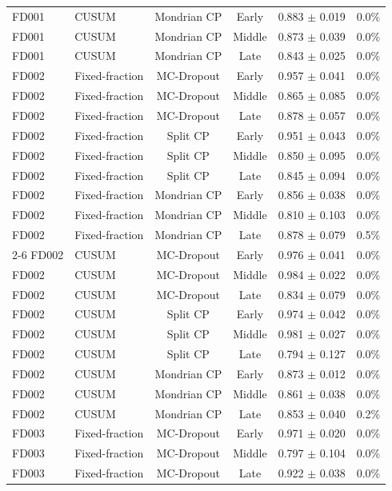 \begin{table}[t]
\begin{tabular}{llcccc}
FD001 & CUSUM & Mondrian CP & Early & 0.883 $\pm$ 0.019 & 0.0\% \\
FD001 & CUSUM & Mondrian CP & Middle & 0.873 $\pm$ 0.039 & 0.0\% \\
FD001 & CUSUM & Mondrian CP & Late & 0.843 $\pm$ 0.025 & 0.0\% \\
\midrule
FD002 & Fixed-fraction & MC-Dropout & Early & 0.957 $\pm$ 0.041 & 0.0\% \\
FD002 & Fixed-fraction & MC-Dropout & Middle & 0.865 $\pm$ 0.085 & 0.0\% \\
FD002 & Fixed-fraction & MC-Dropout & Late & 0.878 $\pm$ 0.057 & 0.0\% \\
FD002 & Fixed-fraction & Split CP & Early & 0.951 $\pm$ 0.043 & 0.0\% \\
FD002 & Fixed-fraction & Split CP & Middle & 0.850 $\pm$ 0.095 & 0.0\% \\
FD002 & Fixed-fraction & Split CP & Late & 0.845 $\pm$ 0.094 & 0.0\% \\
FD002 & Fixed-fraction & Mondrian CP & Early & 0.856 $\pm$ 0.038 & 0.0\% \\
FD002 & Fixed-fraction & Mondrian CP & Middle & 0.810 $\pm$ 0.103 & 0.0\% \\
FD002 & Fixed-fraction & Mondrian CP & Late & 0.878 $\pm$ 0.079 & 0.5\% \\
\cmidrule{2-6}
FD002 & CUSUM & MC-Dropout & Early & 0.976 $\pm$ 0.041 & 0.0\% \\
FD002 & CUSUM & MC-Dropout & Middle & 0.984 $\pm$ 0.022 & 0.0\% \\
FD002 & CUSUM & MC-Dropout & Late & 0.834 $\pm$ 0.079 & 0.0\% \\
FD002 & CUSUM & Split CP & Early & 0.974 $\pm$ 0.042 & 0.0\% \\
FD002 & CUSUM & Split CP & Middle & 0.981 $\pm$ 0.027 & 0.0\% \\
FD002 & CUSUM & Split CP & Late & 0.794 $\pm$ 0.127 & 0.0\% \\
FD002 & CUSUM & Mondrian CP & Early & 0.873 $\pm$ 0.012 & 0.0\% \\
FD002 & CUSUM & Mondrian CP & Middle & 0.861 $\pm$ 0.038 & 0.0\% \\
FD002 & CUSUM & Mondrian CP & Late & 0.853 $\pm$ 0.040 & 0.2\% \\
\midrule
FD003 & Fixed-fraction & MC-Dropout & Early & 0.971 $\pm$ 0.020 & 0.0\% \\
FD003 & Fixed-fraction & MC-Dropout & Middle & 0.797 $\pm$ 0.104 & 0.0\% \\
FD003 & Fixed-fraction & MC-Dropout & Late & 0.922 $\pm$ 0.038 & 0.0\% \\

\end{tabular}
\end{table}
